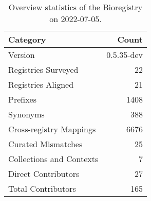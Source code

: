 \begin{table}
\centering
\caption{Overview statistics of the Bioregistry on 2022-07-05.}
\label{tab:bioregistry-summary}
\begin{tabular}{lr}
\toprule
                Category &      Count \\
\midrule
                 Version & 0.5.35-dev \\
     Registries Surveyed &         22 \\
      Registries Aligned &         21 \\
                Prefixes &       1408 \\
                Synonyms &        388 \\
 Cross-registry Mappings &       6676 \\
      Curated Mismatches &         25 \\
Collections and Contexts &          7 \\
     Direct Contributors &         27 \\
      Total Contributors &        165 \\
\bottomrule
\end{tabular}
\end{table}
